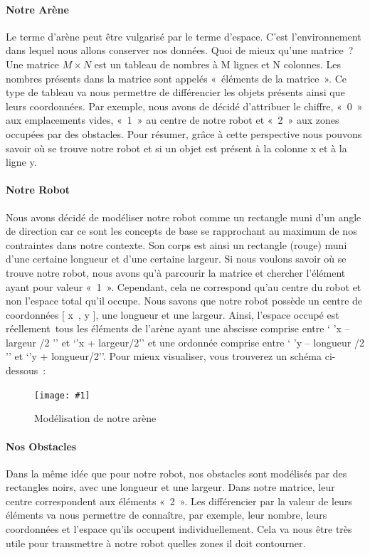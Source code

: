 \documentclass[12pt]{article}
\newcommand\img[2]{
\begin{figure}[!h]
  \centering
    \texttt{[image: \#1]}
  \caption{#2}
  \label{img:#1}
\end{figure}
}
\begin{document}
\paragraph{Notre Arène\\}
Le terme d’arène peut être vulgarisé par le terme d’espace. C’est l’environnement dans lequel nous allons conserver nos données. Quoi de mieux qu’une matrice ? Une matrice $M \times N$ est un tableau de nombres à M lignes et N colonnes. Les nombres présents dans la matrice sont appelés « éléments de la matrice ».  Ce type de tableau va nous permettre de différencier les objets présents ainsi que leurs coordonnées. Par exemple, nous avons de décidé d’attribuer le chiffre, « 0 » aux emplacements vides, « 1 » au centre de notre robot et « 2 » aux zones occupées par des obstacles. Pour résumer, grâce à cette perspective nous pouvons savoir où se trouve notre robot et si un objet est présent à la colonne x et à la ligne y.
\paragraph{Notre Robot\\}
Nous avons décidé de modéliser notre robot comme un rectangle muni d’un angle de direction car ce sont les concepts de base se rapprochant au maximum de nos contraintes dans notre contexte. Son corps est ainsi un rectangle (rouge) muni d’une certaine longueur et d’une certaine largeur. Si nous voulons savoir où se trouve notre robot, nous avons qu’à parcourir la matrice et chercher l’élément ayant pour valeur « 1 ». Cependant, cela ne correspond qu’au centre du robot et non l’espace total qu’il occupe. Nous savons que notre robot possède un centre de coordonnées [ x , y ], une longueur et une largeur. Ainsi, l’espace occupé est réellement tous les éléments de l’arène ayant une abscisse comprise entre ‘ ’x – largeur /2 ’’ et ‘’x + largeur/2’’ et une ordonnée comprise entre ‘ ’y – longueur /2 ’’ et ‘’y + longueur/2’’. Pour mieux visualiser, vous trouverez un schéma ci-dessous :

\img{Images/Robot.png}{Modélisation de notre arène}

\paragraph{Nos Obstacles\\}
Dans la même idée que pour notre robot, nos obstacles sont modélisés par des rectangles noirs, avec une longueur et une largeur. Dans notre matrice, leur centre correspondent aux éléments « 2 ». Les différencier par la valeur de leurs éléments va nous permettre de connaître, par exemple, leur nombre, leurs coordonnées et l’espace qu’ils occupent individuellement. Cela va nous être très utile pour transmettre à notre robot quelles zones il doit contourner.
\end{document}
